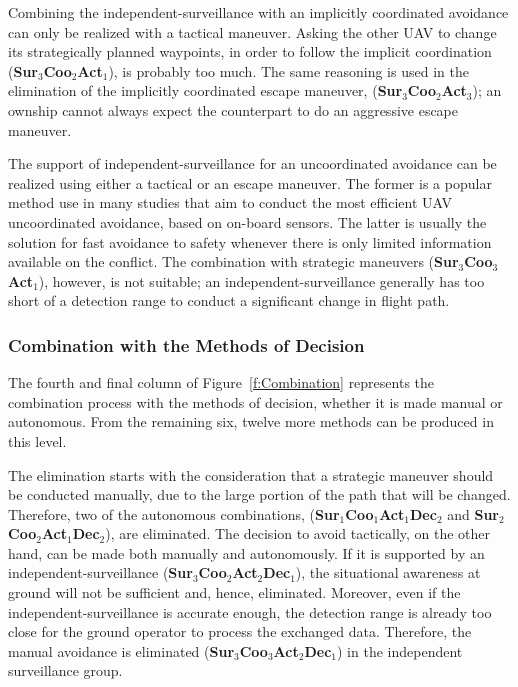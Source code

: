 Combining the independent-surveillance with an implicitly coordinated avoidance can only be realized with a tactical maneuver. Asking the other UAV to change its strategically planned waypoints, in order to follow the implicit coordination (\textbf{Sur$_3$Coo$_2$Act$_1$}), is probably too much. The same reasoning is used in the elimination of the implicitly coordinated escape maneuver, (\textbf{Sur$_3$Coo$_2$Act$_3$}); an ownship cannot always expect the counterpart to do an aggressive escape maneuver. 

The support of independent-surveillance for an uncoordinated avoidance can be realized using either a tactical or an escape maneuver. The former is a popular method use in many studies that aim to conduct the most efficient UAV uncoordinated avoidance, based on on-board sensors. The latter is usually the solution for fast avoidance to safety whenever there is only limited information available on the conflict. The combination with strategic maneuvers (\textbf{Sur$_3$Coo$_3$Act$_1$}), however, is not suitable; an independent-surveillance generally has too short of a detection range to conduct a significant change in flight path.

 \subsubsection{Combination with the Methods of Decision}
The fourth and final column of Figure~\ref{f:Combination} represents the combination process with the methods of decision, whether it is made manual or autonomous. From the remaining six, twelve more methods can be produced in this level. 

The elimination starts with the consideration that a strategic maneuver should be conducted manually, due to the large portion of the path that will be changed. Therefore, two of the autonomous combinations, (\textbf{Sur$_1$Coo$_1$Act$_1$Dec$_2$} and \textbf{Sur$_2$Coo$_2$Act$_1$Dec$_2$}), are eliminated. The decision to avoid tactically, on the other hand, can be made both manually and autonomously. If it is supported by an independent-surveillance (\textbf{Sur$_3$Coo$_2$Act$_2$Dec$_1$}), the situational awareness at ground will not be sufficient and, hence, eliminated. Moreover, even if the independent-surveillance is accurate enough, the detection range is already too close for the ground operator to process the exchanged data. Therefore, the manual avoidance is eliminated (\textbf{Sur$_3$Coo$_3$Act$_2$Dec$_1$}) in the independent surveillance group.

